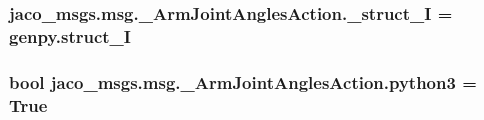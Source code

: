 \subsubsection[{\texorpdfstring{\+\_\+struct\+\_\+I}{_struct_I}}]{\setlength{\rightskip}{0pt plus 5cm}jaco\+\_\+msgs.\+msg.\+\_\+\+Arm\+Joint\+Angles\+Action.\+\_\+struct\+\_\+I = genpy.\+struct\+\_\+I\hspace{0.3cm}{\ttfamily [private]}}\hypertarget{namespacejaco__msgs_1_1msg_1_1__ArmJointAnglesAction_ab7c8cd3be5a2d381abe99365761f80aa}{}\label{namespacejaco__msgs_1_1msg_1_1__ArmJointAnglesAction_ab7c8cd3be5a2d381abe99365761f80aa}
\subsubsection[{\texorpdfstring{python3}{python3}}]{\setlength{\rightskip}{0pt plus 5cm}bool jaco\+\_\+msgs.\+msg.\+\_\+\+Arm\+Joint\+Angles\+Action.\+python3 = True}\hypertarget{namespacejaco__msgs_1_1msg_1_1__ArmJointAnglesAction_a9c298f92819ca065d3bbe1170cc29249}{}\label{namespacejaco__msgs_1_1msg_1_1__ArmJointAnglesAction_a9c298f92819ca065d3bbe1170cc29249}
